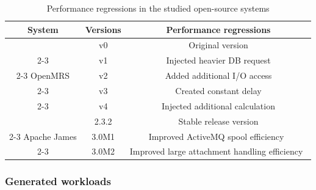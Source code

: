 


\begin{table}[tbh]
  \centering
  \caption{Performance regressions in the studied open-source systems}
    \begin{tabular}{c|c|p{3.3cm}}
    \hline
    System & Versions & \multicolumn{1}{c}{Performance regressions} \\
    \hline
          & v0    & \multicolumn{1}{c}{Original version} \\
\cline{2-3}          & v1    & \multicolumn{1}{c}{Injected heavier DB request} \\
\cline{2-3}    OpenMRS & v2    & \multicolumn{1}{c}{Added additional I/O access} \\
\cline{2-3}          & v3    & \multicolumn{1}{c}{Created constant delay} \\
\cline{2-3}          & v4    & \multicolumn{1}{c}{Injected additional calculation} \\
    \hline
          & 2.3.2 & \multicolumn{1}{c}{Stable release version} \\
          \cline{2-3}
          Apache James & 3.0M1 & \multicolumn{1}{c}{Improved ActiveMQ spool efficiency~\citep{Apache-James}} \\
          \cline{2-3}
          & 3.0M2& \multicolumn{1}{c}{Improved large attachment handling efficiency~\citep{Apache-James}} \\
    \hline
    \end{tabular}%
  \label{tab:workloaddeisign}%
\end{table}%

\subsubsection{Generated workloads}

